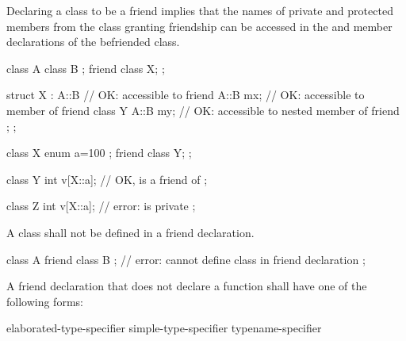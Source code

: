 \pnum
{}%
Declaring a class to be a friend implies that the names of private and
protected members from the class granting friendship can be accessed in the
 and member declarations of the befriended
class.
\begin{example}
\begin{codeblock}
class A {
  class B { };
  friend class X;
};

struct X : A::B {               // OK:  accessible to friend
  A::B mx;                      // OK:  accessible to member of friend
  class Y {
    A::B my;                    // OK:  accessible to nested member of friend
  };
};
\end{codeblock}
\end{example}
\begin{example}
\begin{codeblock}
class X {
  enum { a=100 };
  friend class Y;
};

class Y {
  int v[X::a];                  // OK,  is a friend of 
};

class Z {
  int v[X::a];                  // error:  is private
};
\end{codeblock}
\end{example}

A class shall not be defined in a friend declaration.
\begin{example}
\begin{codeblock}
class A {
  friend class B { };           // error: cannot define class in friend declaration
};
\end{codeblock}
\end{example}

\pnum
A friend declaration that does not declare a function
shall have one of the following forms:

\begin{ncsimplebnf}
 elaborated-type-specifier \terminal{;}\br
{} simple-type-specifier \terminal{;}\br
{} typename-specifier \terminal{;}
\end{ncsimplebnf}

